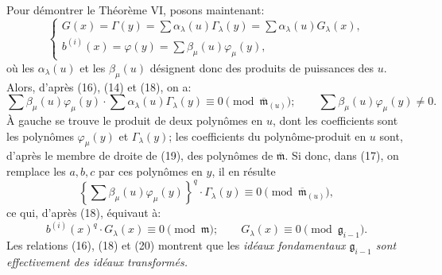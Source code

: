 \documentclass[11pt]{article}
\providecommand{\mideal}{\mathfrak m}
\providecommand{\gideal}{\mathfrak g}
\providecommand{\zero}[1]{\equiv 0\pmod{#1}}
\begin{document}
Pour démontrer le Théorème VI, posons maintenant:
\begin{equation}
\begin{cases}
 G(x)=\Gamma(y)=\sum \alpha_\lambda(u)\Gamma_\lambda(y)=\sum \alpha_\lambda(u)G_\lambda(x),\\
 b^{(i)}(x)=\varphi(y)=\sum \beta_\mu(u)\varphi_\mu(y),
\end{cases}
\tag{18}
\end{equation}
où les $\alpha_\lambda(u)$ et les $\beta_\mu(u)$ désignent donc des produits de puissances des $u$. Alors, d'après (16), (14) et (18), on a:
\begin{equation}
 \sum\beta_\mu(u)\varphi_\mu(y)\cdot
 \sum\alpha_\lambda(u)\Gamma_\lambda(y)\zero{\overline{\mideal}_{(u)}};
 \qquad
 \sum\beta_\mu(u)\varphi_\mu(y)\ne0.
\tag{19}
\end{equation}
À gauche se trouve le produit de deux polynômes en $u$, dont les coefficients sont les polynômes $\varphi_\mu(y)$ et $\Gamma_\lambda(y)$; les coefficients du polynôme-produit en $u$ sont, d'après le membre de droite de (19), des polynômes de $\overline{\mideal}$. Si donc, dans (17), on remplace les $a,b,c$ par ces polynômes en $y$, il en résulte
\[
 \left\{\sum\beta_\mu(u)\varphi_\mu(y)\right\}^q\cdot \Gamma_\lambda(y)\zero{\overline{\mideal}_{(u)}},
\]
ce qui, d'après (18), équivaut à:
\begin{equation}
 b^{(i)}(x)^q\cdot G_\lambda(x)\zero{\mideal};
 \qquad
 G_\lambda(x)\zero{\gideal_{i-1}}.
\tag{20}
\end{equation}
Les relations (16), (18) et (20) montrent que les \emph{idéaux fondamentaux $\gideal_{i-1}$ sont effectivement des idéaux transformés.}

\clearpage
\ifdefined\NoetherPaperTwentyTwoSThreeBodyOnly
\else
\end{document}
